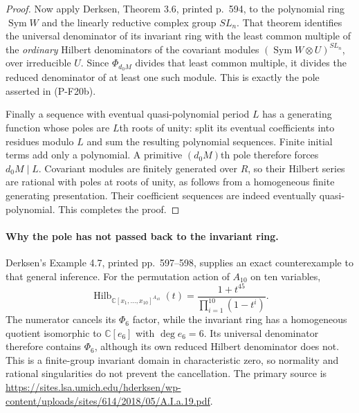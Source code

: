 \documentclass[11pt,a4paper]{article}
\begin{document}
\begin{proof}
Now apply Derksen, Theorem 3.6, printed p.~594, to the polynomial
ring $\operatorname{Sym}W$ and the linearly reductive complex group
$SL_n$. That theorem identifies the universal denominator of
its invariant ring with the least common multiple of the
\emph{ordinary} Hilbert denominators of the covariant modules
$(\operatorname{Sym}W\otimes U)^{SL_n}$, over irreducible $U$.
Since $\Phi_{d_0M}$ divides that least common multiple, it divides
the reduced denominator of at least one such module. This is
exactly the pole asserted in (P-F20b).

Finally a sequence with eventual quasi-polynomial period $L$
has a generating function whose poles are $L$th roots of unity:
split its eventual coefficients into residues modulo $L$ and
sum the resulting polynomial sequences. Finite initial terms
add only a polynomial. A primitive $(d_0M)$th pole therefore
forces $d_0M\mid L$. Covariant modules are finitely generated
over $R$, so their Hilbert series are rational with poles at
roots of unity, as follows from a homogeneous finite generating
presentation. Their coefficient sequences are indeed eventually
quasi-polynomial. This completes the proof.
\end{proof}

\paragraph{Why the pole has not passed back to the invariant ring.}
Derksen's Example 4.7, printed pp.~597--598, supplies an exact
counterexample to that general inference. For the permutation action
of $A_{10}$ on ten variables,
\[
 \operatorname{Hilb}_{\mathbb C[x_1,\ldots,x_{10}]^{A_{10}}}(t)
   =\frac{1+t^{45}}{\prod_{i=1}^{10}(1-t^i)}.
\]
The numerator cancels its $\Phi_6$ factor, while the invariant
ring has a homogeneous quotient isomorphic to $\mathbb C[e_6]$
with $\deg e_6=6$. Its universal denominator therefore contains
$\Phi_6$, although its own reduced Hilbert denominator does not.
This is a finite-group invariant domain in characteristic zero,
so normality and rational singularities do not prevent the
cancellation. The primary source is
\url{https://sites.lsa.umich.edu/hderksen/wp-content/uploads/sites/614/2018/05/A.I.a.19.pdf}.
\end{document}
